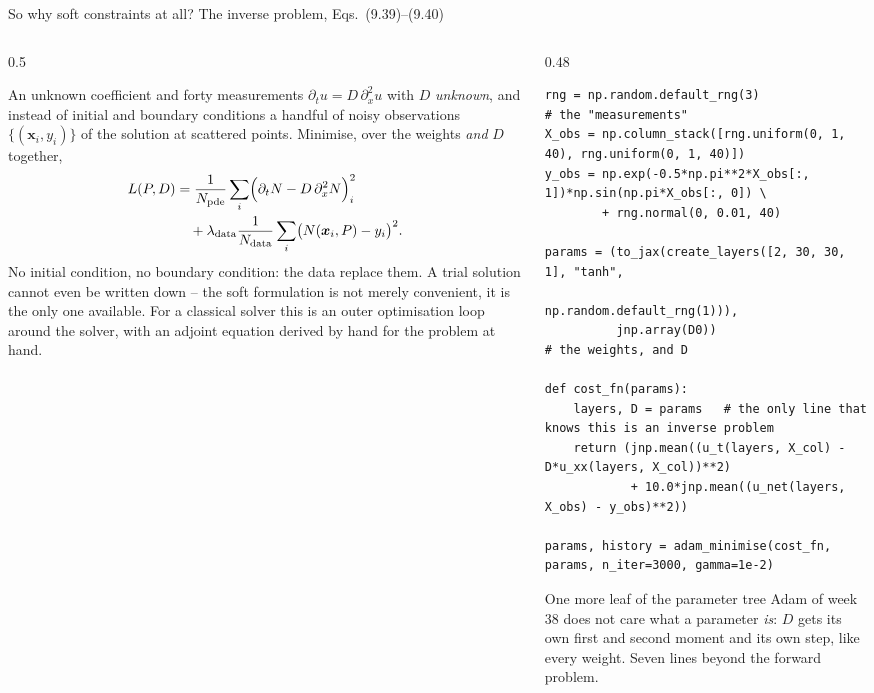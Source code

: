\documentclass[10pt,aspectratio=169]{beamer}
\begin{document}
\begin{frame}[fragile]{So why soft constraints at all?  The inverse problem, Eqs.~(9.39)--(9.40)}
\begin{columns}[T]
\begin{column}{0.5\textwidth}
\begin{block}{An unknown coefficient and forty measurements}
\scriptsize
$\partial_tu=D\,\partial_x^{2}u$ with $D$ \emph{unknown}, and instead of
initial and boundary conditions a handful of noisy observations
$\{(\bm{x}_i,y_i)\}$ of the solution at scattered points.  Minimise, over
the weights \emph{and} $D$ together,
\begin{align*}
  L(P,D)&=\frac{1}{N_{\mathrm{pde}}}\sum_i\Bigl(\partial_tN-D\,\partial_x^{2}N\Bigr)^{2}_i\\
  &\quad+\lambda_{\mathrm{data}}\frac{1}{N_{\mathrm{data}}}\sum_i\bigl(N(\bm{x}_i,P)-y_i\bigr)^{2}.
\end{align*}
No initial condition, no boundary condition: the data replace them.  A trial
solution cannot even be written down -- the soft formulation is not merely
convenient, it is the only one available.  For a classical solver this is
an outer optimisation loop around the solver, with an adjoint equation
derived by hand for the problem at hand.
\end{block}
\end{column}
\begin{column}{0.48\textwidth}
\lstset{basicstyle=\ttfamily\tiny}
\begin{lstlisting}
rng = np.random.default_rng(3)                  # the "measurements"
X_obs = np.column_stack([rng.uniform(0, 1, 40), rng.uniform(0, 1, 40)])
y_obs = np.exp(-0.5*np.pi**2*X_obs[:, 1])*np.sin(np.pi*X_obs[:, 0]) \
        + rng.normal(0, 0.01, 40)

params = (to_jax(create_layers([2, 30, 30, 1], "tanh",
                               np.random.default_rng(1))),
          jnp.array(D0))                        # the weights, and D

def cost_fn(params):
    layers, D = params   # the only line that knows this is an inverse problem
    return (jnp.mean((u_t(layers, X_col) - D*u_xx(layers, X_col))**2)
            + 10.0*jnp.mean((u_net(layers, X_obs) - y_obs)**2))

params, history = adam_minimise(cost_fn, params, n_iter=3000, gamma=1e-2)
\end{lstlisting}
\begin{block}{One more leaf of the parameter tree}
\scriptsize
Adam of week 38 does not care what a parameter \emph{is}: $D$ gets its own
first and second moment and its own step, like every weight.  Seven lines
beyond the forward problem.
\end{block}
\end{column}
\end{columns}
\end{frame}
\end{document}
